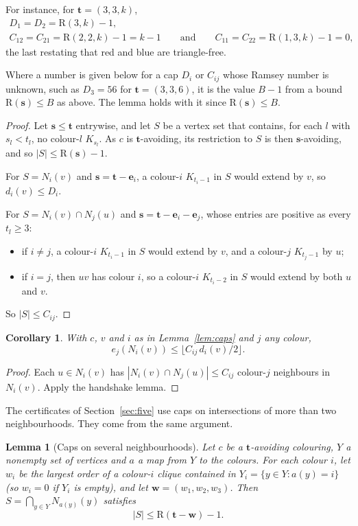 \documentclass[11pt]{article}
\theoremstyle{spacedplain}
\newtheorem{lemma}[theorem]{Lemma}
\newtheorem{corollary}[theorem]{Corollary}
\theoremstyle{spaceddef}
\theoremstyle{spacedremark}
\newcommand{\R}{\mathrm{R}}
\newcommand{\bt}{\mathbf{t}}
\newcommand{\e}{\mathbf{e}}
\begin{document}
For instance, for $\bt=(3,3,k)$,
\begin{gather*}
D_1=D_2=\R(3,k)-1,\\
C_{12}=C_{21}=\R(2,2,k)-1=k-1\qquad\text{and}\qquad C_{11}=C_{22}=\R(1,3,k)-1=0,
\end{gather*}
the last restating that red and blue are triangle-free.

Where a number is given below for a cap $D_i$ or $C_{ij}$ whose Ramsey number is unknown, such as $D_3=56$ for $\bt=(3,3,6)$, it is the value $B-1$ from a bound $\R(\mathbf s)\le B$ as above.
The lemma holds with it since $\R(\mathbf s)\le B$.

\begin{proof}
Let $\mathbf s\le\bt$ entrywise, and let $S$ be a vertex set that contains, for each $l$ with $s_l<t_l$, no colour-$l$ $K_{s_l}$.
As $c$ is $\bt$-avoiding, its restriction to $S$ is then $\mathbf s$-avoiding, and so $|S|\le\R(\mathbf s)-1$.

For $S=N_i(v)$ and $\mathbf s=\bt-\e_i$, a colour-$i$ $K_{t_i-1}$ in $S$ would extend by $v$, so $d_i(v)\le D_i$.

For $S=N_i(v)\cap N_j(u)$ and $\mathbf s=\bt-\e_i-\e_j$, whose entries are positive as every $t_l\ge 3$:
\begin{itemize}
\item if $i\ne j$, a colour-$i$ $K_{t_i-1}$ in $S$ would extend by $v$, and a colour-$j$ $K_{t_j-1}$ by $u$;
\item if $i=j$, then $uv$ has colour $i$, so a colour-$i$ $K_{t_i-2}$ in $S$ would extend by both $u$ and $v$.
\end{itemize}
So $|S|\le C_{ij}$.
\end{proof}

\begin{corollary}\label{cor:handshake}
With $c$, $v$ and $i$ as in Lemma~\ref{lem:caps} and $j$ any colour,
\[
e_j(N_i(v))\le\lfloor C_{ij}\,d_i(v)/2\rfloor.
\]
\end{corollary}

\begin{proof}
Each $u\in N_i(v)$ has $|N_i(v)\cap N_j(u)|\le C_{ij}$ colour-$j$ neighbours in $N_i(v)$.
Apply the handshake lemma.
\end{proof}

The certificates of Section~\ref{sec:five} use caps on intersections of more than two neighbourhoods.
They come from the same argument.

\begin{lemma}[Caps on several neighbourhoods]\label{lem:multicaps}
Let $c$ be a $\bt$-avoiding colouring, $Y$ a nonempty set of vertices and $a$ a map from $Y$ to the colours.
For each colour $i$, let $w_i$ be the largest order of a colour-$i$ clique contained in $Y_i=\{y\in Y:a(y)=i\}$ (so $w_i=0$ if $Y_i$ is empty), and let $\mathbf w=(w_1,w_2,w_3)$.
Then $S=\bigcap_{y\in Y}N_{a(y)}(y)$ satisfies
\[
|S|\le\R(\bt-\mathbf w)-1.
\]
\end{lemma}
\end{document}
